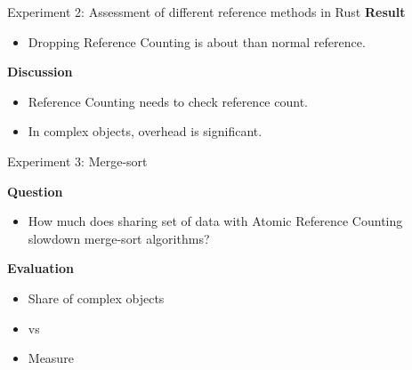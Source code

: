\documentclass[9pt]{beamer}
\begin{document}
\begin{frame}[fragile]{Experiment 2: Assessment of different reference methods in Rust}
    \textbf{Result}
    \begin{itemize}
        \item Dropping Reference Counting is about  than normal reference.
    \end{itemize}

    \vspace{0.5cm}

    \textbf{Discussion}
    \begin{itemize}
        \item Reference Counting needs to check reference count.
        \item In complex objects, overhead is significant.
    \end{itemize}
\end{frame}


\begin{frame}[fragile]{Experiment 3: Merge-sort}

    \textbf{Question}
    \begin{itemize}
        \item How much does sharing set of data with Atomic Reference Counting slowdown merge-sort algorithms?
    \end{itemize}

    \vspace{0.5cm}

    \textbf{Evaluation}
    \begin{itemize}
        \item Share  of complex objects
        \item {} vs 
        \item Measure 
    \end{itemize}

\end{frame}

\end{document}
